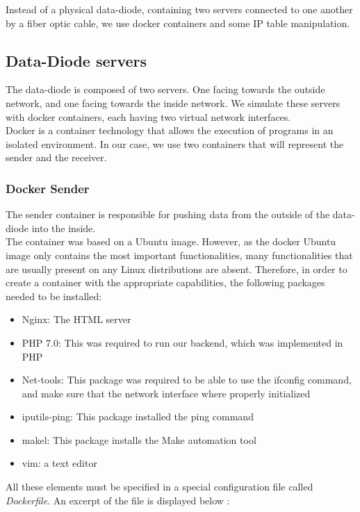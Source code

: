 \documentclass[a4paper,11pt]{article}
\begin{document}
Instead of a physical data-diode, containing two servers connected to one another by a fiber optic cable, we use docker containers and some IP table manipulation.

\subsection{Data-Diode servers}
The data-diode is composed of two servers. One facing towards the outside network, and one facing towards the inside network. We simulate these servers with docker containers, each having two virtual network interfaces.\\

Docker is a container technology that allows the execution of programs in an isolated environment. In our case, we use two containers that will represent the sender and the receiver.

\subsubsection{Docker Sender}
The sender container is responsible for pushing data from the outside of the data-diode into the inside.\\

The container was based on a Ubuntu image. However, as the docker Ubuntu image only contains the most important functionalities, many functionalities that are usually present on any Linux distributions are absent. Therefore, in order to create a container with the appropriate capabilities, the following packages needed to be installed:

\begin{itemize}
	\item{Nginx: The HTML server}
	\item{PHP 7.0: This was required to run our backend, which was implemented in PHP}
	\item{Net-tools: This package was required to be able to use the ifconfig command, and make sure that the network interface where properly initialized}
	\item{iputils-ping: This package installed the ping command}
	\item{makel: This package installs the Make automation tool}
	\item{vim: a text editor}
\end{itemize}

All these elements must be specified in a special configuration file called \textit{Dockerfile}. An excerpt of the file is displayed below :\\
\end{document}
